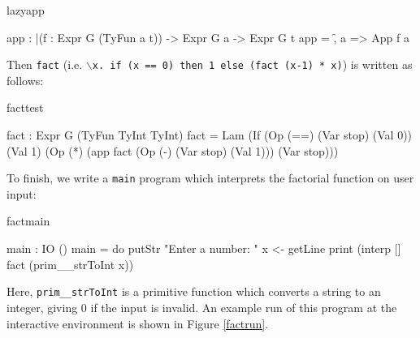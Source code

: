 \begin{SaveVerbatim}{lazyapp}
 
app : |(f : Expr G (TyFun a t)) -> Expr G a -> Expr G t
app = \f, a => App f a

\end{SaveVerbatim}

\noindent
Then \texttt{fact} 
(i.e. \texttt{$\backslash$x. if (x == 0) then 1 else (fact (x-1) * x)})
is written as follows:

\begin{SaveVerbatim}{facttest}

fact : Expr G (TyFun TyInt TyInt)
fact = Lam (If (Op (==) (Var stop) (Val 0))
               (Val 1) (Op (*) (app fact (Op (-) (Var stop) (Val 1))) 
                               (Var stop)))

\end{SaveVerbatim}

To finish, we write a \texttt{main} program which interprets the factorial function
on user input:

\begin{SaveVerbatim}{factmain}

main : IO ()
main = do putStr "Enter a number: "
          x <- getLine
          print (interp [] fact (prim__strToInt x)) 

\end{SaveVerbatim}

\noindent
Here, \texttt{prim\_\_strToInt} is a primitive function which converts a string to
an integer, giving 0 if the input is invalid. An example run of this program
at the \Idris{} interactive environment is shown in Figure \ref{factrun}.


